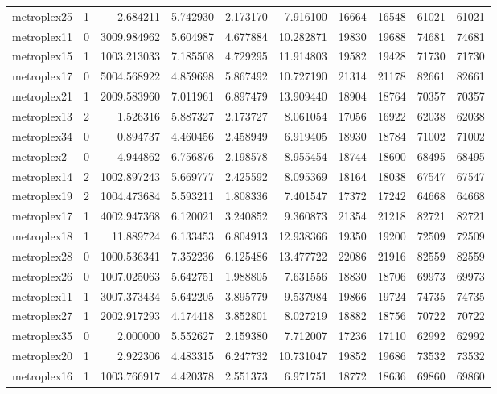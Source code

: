 \begin{longtable}{|l|r|r|r|r|r|r|r|r|r|}
metroplex25 & 1 & 2.684211 & 5.742930 & 2.173170 & 7.916100 & 16664 & 16548 & 61021 & 61021 \\
metroplex11 & 0 & 3009.984962 & 5.604987 & 4.677884 & 10.282871 & 19830 & 19688 & 74681 & 74681 \\
metroplex15 & 1 & 1003.213033 & 7.185508 & 4.729295 & 11.914803 & 19582 & 19428 & 71730 & 71730 \\
metroplex17 & 0 & 5004.568922 & 4.859698 & 5.867492 & 10.727190 & 21314 & 21178 & 82661 & 82661 \\
metroplex21 & 1 & 2009.583960 & 7.011961 & 6.897479 & 13.909440 & 18904 & 18764 & 70357 & 70357 \\
metroplex13 & 2 & 1.526316 & 5.887327 & 2.173727 & 8.061054 & 17056 & 16922 & 62038 & 62038 \\
metroplex34 & 0 & 0.894737 & 4.460456 & 2.458949 & 6.919405 & 18930 & 18784 & 71002 & 71002 \\
metroplex2 & 0 & 4.944862 & 6.756876 & 2.198578 & 8.955454 & 18744 & 18600 & 68495 & 68495 \\
metroplex14 & 2 & 1002.897243 & 5.669777 & 2.425592 & 8.095369 & 18164 & 18038 & 67547 & 67547 \\
metroplex19 & 2 & 1004.473684 & 5.593211 & 1.808336 & 7.401547 & 17372 & 17242 & 64668 & 64668 \\
metroplex17 & 1 & 4002.947368 & 6.120021 & 3.240852 & 9.360873 & 21354 & 21218 & 82721 & 82721 \\
metroplex18 & 1 & 11.889724 & 6.133453 & 6.804913 & 12.938366 & 19350 & 19200 & 72509 & 72509 \\
metroplex28 & 0 & 1000.536341 & 7.352236 & 6.125486 & 13.477722 & 22086 & 21916 & 82559 & 82559 \\
metroplex26 & 0 & 1007.025063 & 5.642751 & 1.988805 & 7.631556 & 18830 & 18706 & 69973 & 69973 \\
metroplex11 & 1 & 3007.373434 & 5.642205 & 3.895779 & 9.537984 & 19866 & 19724 & 74735 & 74735 \\
metroplex27 & 1 & 2002.917293 & 4.174418 & 3.852801 & 8.027219 & 18882 & 18756 & 70722 & 70722 \\
metroplex35 & 0 & 2.000000 & 5.552627 & 2.159380 & 7.712007 & 17236 & 17110 & 62992 & 62992 \\
metroplex20 & 1 & 2.922306 & 4.483315 & 6.247732 & 10.731047 & 19852 & 19686 & 73532 & 73532 \\
metroplex16 & 1 & 1003.766917 & 4.420378 & 2.551373 & 6.971751 & 18772 & 18636 & 69860 & 69860 \\

\end{longtable}
